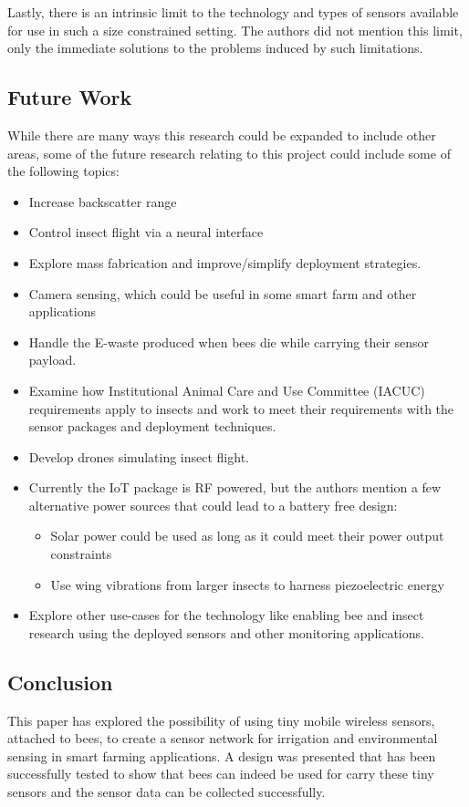 \documentclass[letterpaper,twocolumn,10pt]{article}
\begin{document}
Lastly, there is an intrinsic limit to the technology and types of sensors available for use in such a size constrained setting. The authors did not mention this limit, only the immediate solutions to the problems induced by such limitations.

\subsection*{Future Work}

While there are many ways this research could be expanded to include other areas, some of the future research relating to this project could include some of the following topics: 

\begin{itemize}
	\item Increase backscatter range
	\item Control insect flight via a neural interface
	\item Explore mass fabrication and improve/simplify deployment strategies.
	\item Camera sensing, which could be useful in some smart farm and other applications
	\item Handle the E-waste produced when bees die while carrying their sensor payload.
	\item Examine how Institutional Animal Care and Use Committee (IACUC) requirements apply to insects and work to meet their requirements with the sensor packages and deployment techniques.
	\item Develop drones simulating insect flight.
	\item Currently the IoT package is RF powered, but the authors mention a few alternative power sources that could lead to a battery free design:
	      \begin{itemize}
	      	\item Solar power could be used as long as it could meet their power output constraints
	      	\item Use wing vibrations from larger insects to harness piezoelectric energy
	      \end{itemize}
	\item Explore other use-cases for the technology like enabling bee and insect research using the deployed sensors and other monitoring applications.
\end{itemize}


\subsection*{Conclusion}

This paper has explored the possibility of using tiny mobile wireless sensors, attached to bees, to create a sensor network for irrigation and environmental sensing in smart farming applications. A design was presented that has been successfully tested to show that bees can indeed be used for carry these tiny sensors and the sensor data can be collected successfully. 
\end{document}
